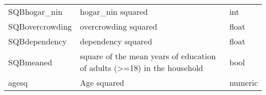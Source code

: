 \documentclass[11pt]{article}
\begin{document}
\begin{longtable}[]{@{}lll@{}}
\begin{minipage}[t]{0.19\columnwidth}\raggedright\strut
SQBhogar\_nin\strut
\end{minipage} & \begin{minipage}[t]{0.16\columnwidth}\raggedright\strut
hogar\_nin squared\strut
\end{minipage} & \begin{minipage}[t]{0.24\columnwidth}\raggedright\strut
int\strut
\end{minipage}\tabularnewline
\begin{minipage}[t]{0.19\columnwidth}\raggedright\strut
SQBovercrowding\strut
\end{minipage} & \begin{minipage}[t]{0.16\columnwidth}\raggedright\strut
overcrowding squared\strut
\end{minipage} & \begin{minipage}[t]{0.24\columnwidth}\raggedright\strut
float\strut
\end{minipage}\tabularnewline
\begin{minipage}[t]{0.19\columnwidth}\raggedright\strut
SQBdependency\strut
\end{minipage} & \begin{minipage}[t]{0.16\columnwidth}\raggedright\strut
dependency squared\strut
\end{minipage} & \begin{minipage}[t]{0.24\columnwidth}\raggedright\strut
float\strut
\end{minipage}\tabularnewline
\begin{minipage}[t]{0.19\columnwidth}\raggedright\strut
SQBmeaned\strut
\end{minipage} & \begin{minipage}[t]{0.16\columnwidth}\raggedright\strut
square of the mean years of education of adults (\textgreater{}=18) in
the household\strut
\end{minipage} & \begin{minipage}[t]{0.24\columnwidth}\raggedright\strut
bool\strut
\end{minipage}\tabularnewline
\begin{minipage}[t]{0.19\columnwidth}\raggedright\strut
agesq\strut
\end{minipage} & \begin{minipage}[t]{0.16\columnwidth}\raggedright\strut
Age squared\strut
\end{minipage} & \begin{minipage}[t]{0.24\columnwidth}\raggedright\strut
numeric\strut
\end{minipage}\tabularnewline
\bottomrule
\end{longtable}
\end{document}
